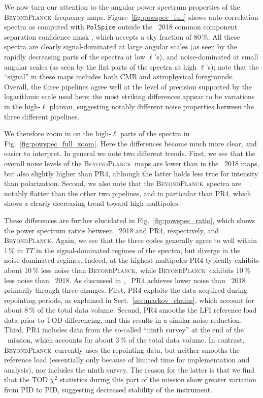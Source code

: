\documentclass[twocolumn]{aa}
\newcommand{\BP}{\textsc{BeyondPlanck}}
\begin{document}
We now turn our attention to the angular power spectrum properties of
the \BP\ frequency maps. Figure~\ref{fig:powspec_full} shows
auto-correlation spectra as computed with \texttt{PolSpice}
\citep{chon2004} outside the \Planck\ 2018 common component separation
confidence mask \citep{planck2016-l04}, which accepts a sky fraction
of 80\,\%. All these spectra are clearly signal-dominated at large
angular scales (as seen by the rapidly decreasing parts of the spectra
at low $\ell$'s), and noise-dominated at small angular scales (as seen
by the flat parts of the spectra at high $\ell$'s); note that the
``signal'' in these maps includes both CMB and astrophysical
foregrounds. Overall, the three pipelines agree well at the level of
precision supported by the logarithmic scale used here; the most striking
differences appear to be variations in the high-$\ell$ plateau,
suggesting notably different noise properties between the three
different pipelines.

We therefore zoom in on the high-$\ell$ parts of the spectra in
Fig.~\ref{fig:powspec_full_zoom}. Here the differences become much
more clear, and easier to interpret. In general we note two
different trends. First, we see that the overall noise levels of the
\BP\ maps are lower than in the \Planck\ 2018 maps, but also slightly
higher than PR4, although the latter holds less true for intensity
than polarization. Second, we also note that the \BP\ spectra are
notably flatter than the other two pipelines, and in particular than
PR4, which shows a clearly decreasing trend toward high multipoles.

These differences are further elucidated in
Fig.~\ref{fig:powspec_ratio}, which shows the power spectrum ratios
between \Planck\ 2018 and PR4, respectively, and \BP. Again, we see
that the three codes generally agree to well within 1\,\% in $TT$ in
the signal-dominated regimes of the spectra, but diverge in the
noise-dominated regimes. Indeed, at the highest multipoles PR4
typically exhibits about 10\,\% less noise than \BP, while
\BP\ exhibits 10\,\% less noise than \Planck\ 2018. As discussed in
\citet{planck2020-LVII}, \Planck\ PR4 achieves lower noise than
\Planck\ 2018 primarily through three changes. First, PR4 exploits the
data acquired during repointing periods, as explained in
Sect.~\ref{sec:markov_chains}, which account for about 8\,\% of the
total data volume. Second, PR4 smooths the LFI reference load data
prior to TOD differencing, and this results in a similar noise
reduction. Third, PR4 includes data from the so-called ``ninth
survey'' at the end of the \Planck\ mission, which accounts for about
3\,\% of the total data volume. In contrast, \BP\ currently uses the
repointing data, but neither smooths the reference load (essentially
only because of limited time for implementation and analysis), nor
includes the ninth survey. The reason for the latter is that we find
that the TOD $\chi^2$ statistics during this part of the mission show
greater variation from PID to PID, suggesting decreased stability of
the instrument.
\end{document}
